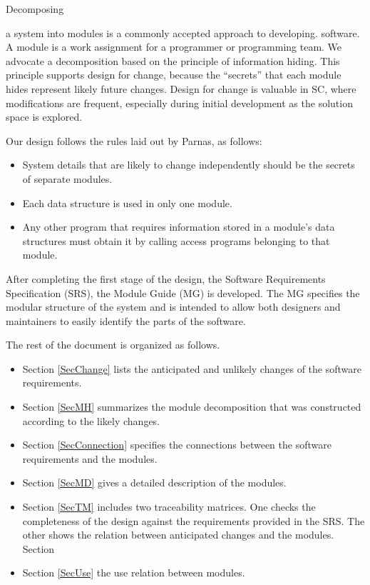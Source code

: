 \documentclass[12pt, titlepage]{article}
\begin{document}
\hypertarget{Decomposing}{Decomposing} a system into modules is a commonly accepted approach to developing.
software.  A module is a work assignment for a programmer or programming
team.  We advocate a decomposition
based on the principle of information hiding.  This principle supports design for change, because the ``secrets'' that each module
hides represent likely future changes.  Design for change is valuable in SC,
where modifications are frequent, especially during initial development as the
solution space is explored.

Our design follows the rules laid out by Parnas, as follows:
\begin{itemize}
\item System details that are likely to change independently should be the
  secrets of separate modules.
\item Each data structure is used in only one module.
\item Any other program that requires information stored in a module's data
  structures must obtain it by calling access programs belonging to that module.
\end{itemize}

After completing the first stage of the design, the Software Requirements
Specification (SRS), the Module Guide (MG) is developed. The MG
specifies the modular structure of the system and is intended to allow both
designers and maintainers to easily identify the parts of the software.  


The rest of the document is organized as follows. 
\begin {itemize}
\item [Section \ref{SecChange}] lists the anticipated and unlikely changes of the software
requirements. 
\item [Section \ref{SecMH}] summarizes the module decomposition that
was constructed according to the likely changes. 
\item [Section \ref{SecConnection}]
specifies the connections between the software requirements and the
modules. 
\item [Section \ref{SecMD}]
gives a detailed description of the
modules. 
\item [Section \ref{SecTM}]
includes two traceability matrices. One checks
the completeness of the design against the requirements provided in the SRS. The
other shows the relation between anticipated changes and the modules. Section\item [Section \ref{SecUse}] 
the use relation between modules.
\end {itemize}
\end{document}

